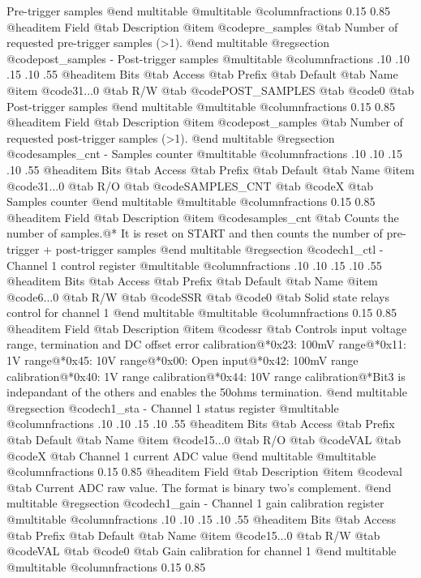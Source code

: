 Pre-trigger samples
@end multitable
@multitable @columnfractions 0.15 0.85
@headitem Field @tab Description
@item @code{pre_samples} @tab Number of requested pre-trigger samples (>1).
@end multitable
@regsection @code{post_samples} - Post-trigger samples
@multitable @columnfractions .10 .10 .15 .10 .55
@headitem Bits @tab Access @tab Prefix @tab Default @tab Name
@item @code{31...0}
@tab R/W @tab
@code{POST_SAMPLES}
@tab @code{0} @tab 
Post-trigger samples
@end multitable
@multitable @columnfractions 0.15 0.85
@headitem Field @tab Description
@item @code{post_samples} @tab Number of requested post-trigger samples (>1).
@end multitable
@regsection @code{samples_cnt} - Samples counter
@multitable @columnfractions .10 .10 .15 .10 .55
@headitem Bits @tab Access @tab Prefix @tab Default @tab Name
@item @code{31...0}
@tab R/O @tab
@code{SAMPLES_CNT}
@tab @code{X} @tab 
Samples counter
@end multitable
@multitable @columnfractions 0.15 0.85
@headitem Field @tab Description
@item @code{samples_cnt} @tab Counts the number of samples.@* It is reset on START and then counts the number of pre-trigger + post-trigger samples
@end multitable
@regsection @code{ch1_ctl} - Channel 1 control register
@multitable @columnfractions .10 .10 .15 .10 .55
@headitem Bits @tab Access @tab Prefix @tab Default @tab Name
@item @code{6...0}
@tab R/W @tab
@code{SSR}
@tab @code{0} @tab 
Solid state relays control for channel 1
@end multitable
@multitable @columnfractions 0.15 0.85
@headitem Field @tab Description
@item @code{ssr} @tab Controls input voltage range, termination and DC offset error calibration@*0x23: 100mV range@*0x11: 1V range@*0x45: 10V range@*0x00: Open input@*0x42: 100mV range calibration@*0x40: 1V range calibration@*0x44: 10V range calibration@*Bit3 is indepandant of the others and enables the 50ohms termination.
@end multitable
@regsection @code{ch1_sta} - Channel 1 status register
@multitable @columnfractions .10 .10 .15 .10 .55
@headitem Bits @tab Access @tab Prefix @tab Default @tab Name
@item @code{15...0}
@tab R/O @tab
@code{VAL}
@tab @code{X} @tab 
Channel 1 current ADC value
@end multitable
@multitable @columnfractions 0.15 0.85
@headitem Field @tab Description
@item @code{val} @tab Current ADC raw value. The format is binary two's complement.
@end multitable
@regsection @code{ch1_gain} - Channel 1 gain calibration register
@multitable @columnfractions .10 .10 .15 .10 .55
@headitem Bits @tab Access @tab Prefix @tab Default @tab Name
@item @code{15...0}
@tab R/W @tab
@code{VAL}
@tab @code{0} @tab 
Gain calibration for channel 1
@end multitable
@multitable @columnfractions 0.15 0.85
